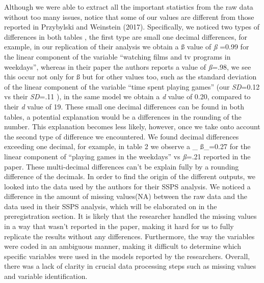 \documentclass[man]{apa6}
\theoremstyle{definition}
\theoremstyle{definition}
\theoremstyle{definition}
\theoremstyle{remark}
\begin{document}
Although we were able to extract all the important statistics from the
raw data without too many issues, notice that some of our values are
different from those reported in Przybylski and Weinstein (2017).
Specifically, we noticed two types of differences in both tables , the
first type are small one decimal differences, for example, in our
replication of their analysis we obtain a ß value of \emph{ß} =0.99 for
the linear component of the variable \enquote{watching films and tv
programs in weekdays}, whereas in their paper the authors reports a
value of \emph{ß}=.98, we see this occur not only for ß but for other
values too, such as the standard deviation of the linear component of
the variable \enquote{time spent playing games} (our \emph{SD}=0.12 vs
their \emph{SD}=.11 ), in the same model we obtain a
\emph{\textbar{}d\textbar{}} value of 0.20, compared to their
\emph{\textbar{}d\textbar{}} value of 19. These small one decimal
differences can be found in both tables, a potential explanation would
be a differences in the rounding of the number. This explanation becomes
less likely, however, once we take onto account the second type of
difference we encountered. We found decimal differences exceeding one
decimal, for example, in table 2 we observe a \_ ß\_=0.27 for the linear
component of \enquote{playing games in the weekdays} vs \emph{ß}=.21
reported in the paper. These multi-decimal differences can't be explain
fully by a rounding difference of the decimals. In order to find the
origin of the different outputs, we looked into the data used by the
authors for their SSPS analysis. We noticed a difference in the amount
of missing values(NA) between the raw data and the data used in their
SSPS analysis, which will be elaborated on in the preregistration
section. It is likely that the researcher handled the missing values in
a way that wasn't reported in the paper, making it hard for us to fully
replicate the results without any differences. Furthermore, the way the
variables were coded in an ambiguous manner, making it difficult to
determine which specific variables were used in the models reported by
the researchers. Overall, there was a lack of clarity in crucial data
processing steps such as missing values and variable identification.
\end{document}
